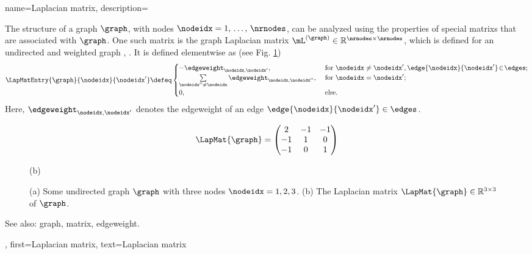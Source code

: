 {name={Laplacian matrix},
	description={The structure of a \gls{graph} $\graph$, with 
		nodes $\nodeidx=1, \,\ldots, \,\nrnodes$, can be analyzed using the properties of 
		special \glspl{matrix} that are associated with $\graph$. One such \gls{matrix} is the 
		\gls{graph} Laplacian \gls{matrix} $\mL^{(\graph)} \in \mathbb{R}^{\nrnodes \times \nrnodes}$, 
		which is defined for an undirected and weighted \gls{graph} \cite{Luxburg2007}, \cite{Ng2001}. 
		It is defined elementwise as (see Fig. \ref{fig_lap_mtx_dict})
		\begin{equation}
			\nonumber
			\LapMatEntry{\graph}{\nodeidx}{\nodeidx'} \defeq \begin{cases} - \edgeweight_{\nodeidx,\nodeidx'}, & \mbox{ for } \nodeidx\neq \nodeidx', \edge{\nodeidx}{\nodeidx'}\!\in\!\edges; \\ 
			\sum\limits_{\nodeidx'' \neq \nodeidx} \edgeweight_{\nodeidx,\nodeidx''}, & \mbox{ for } \nodeidx = \nodeidx'; \\ 
							0, & \mbox{ else.} \end{cases}
	 	\end{equation}
  		Here, $\edgeweight_{\nodeidx,\nodeidx'}$ denotes the \gls{edgeweight} of an edge $\edge{\nodeidx}{\nodeidx'} \in \edges$. 
  		\begin{figure}[H]
  		\begin{center}
   		\begin{minipage}{0.45\textwidth}
	 	\end{minipage} 
	 	\hspace*{-15mm}
 		\begin{minipage}{0.45\textwidth}
	 			 \begin{equation} 
	 				 \LapMat{\graph} = \begin{pmatrix} 2 & -1& -1 \\ -1& 1 & 0 \\  -1 & 0 & 1 \end{pmatrix}  
	 				 \nonumber
	 			\end{equation} 
				\begin{minipage}{\textwidth}
				\vspace{3.5ex}
				\centering
				{\selectfont (b)}
				\end{minipage}
	 	\end{minipage}
	 	\caption{\label{fig_lap_mtx_dict} (a) Some undirected \gls{graph} $\graph$ with three nodes $\nodeidx=1,2,3$. 
	 		 (b) The Laplacian \gls{matrix} $\LapMat{\graph}  \in \mathbb{R}^{3 \times 3}$ of $\graph$.} 
	 	\end{center}
	 	\end{figure}
		See also: \gls{graph}, \gls{matrix}, \gls{edgeweight}.},
	first={Laplacian matrix},
	text={Laplacian matrix}
}

